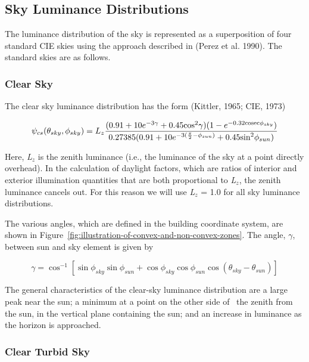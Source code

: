 \subsection{Sky Luminance Distributions}\label{sky-luminance-distributions}

The luminance distribution of the sky is represented as a superposition of four standard CIE skies using the approach described in (Perez et al. 1990). The standard skies are as follows.

\subsubsection{Clear Sky}\label{clear-sky}

The clear sky luminance distribution has the form (Kittler, 1965; CIE, 1973)

\begin{equation}
{\psi_{cs}}({\theta_{sky}},{\phi_{sky}}) = {L_z}\frac{{(0.91 + 10{e^{ - 3\gamma }} + 0.45{{\cos }^2}\gamma )(1 - {e^{ - 0.32{\rm{cosec}}{\phi_{sky}}}})}}{{0.27385(0.91 + 10{e^{ - 3(\frac{\pi }{2} - {\phi_{sun}})}} + 0.45{{\sin }^2}{\phi_{sun}})}}
\end{equation}

Here, \emph{L\(_{z}\)} is the zenith luminance (i.e., the luminance of the sky at a point directly overhead). In the calculation of daylight factors, which are ratios of interior and exterior illumination quantities that are both proportional to \emph{L\(_{z}\)}, the zenith luminance cancels out. For this reason we will use \emph{L\(_{z}\)} = 1.0 for all sky luminance distributions.

The various angles, which are defined in the building coordinate system, are shown in Figure~\ref{fig:illustration-of-convex-and-non-convex-zones}. The angle, $\gamma$, between sun and sky element is given by

\begin{equation}
\gamma  = {\cos ^{ - 1}}\left[ {\sin {\phi_{sky}}\sin {\phi_{sun}} + \cos {\phi_{sky}}\cos {\phi_{sun}}\cos ({\theta_{sky}} - {\theta_{sun}})} \right]
\end{equation}

The general characteristics of the clear-sky luminance distribution are a large peak near the sun; a minimum at a point on the other side of~ the zenith from the sun, in the vertical plane containing the sun; and an increase in luminance as the horizon is approached.

\subsubsection{Clear Turbid Sky}\label{clear-turbid-sky}

